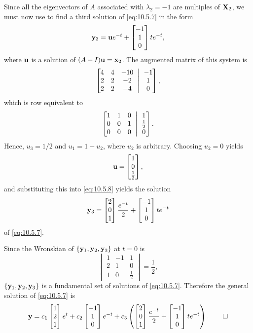 \begin{solution}
Since all the eigenvectors of $A$ associated with $\lambda_2=-1$ are
multiples of $\mathbf{X}_2$, we must now use  to
find a third solution of \eqref{eq:10.5.7} in the form
\begin{equation}\label{eq:10.5.8}
\mathbf{y}_3=\mathbf{u}e^{-t}+\begin{bmatrix}-1\\1\\0\end{bmatrix}te^{-t},
\end{equation}
where $\mathbf{u}$ is a solution of $(A+I)\mathbf{u}=\mathbf{x}_2$.
The  augmented matrix  of this system is
\[
\amatrix{4&4&-10\\2&2&-2\\2&2&-4}{-1\\1\\0},
\]
which is row equivalent to
\[
\amatrix{1&1&0\\0&0&1\\0&0&0}{1\\\frac12\\0}.
\]
Hence, $u_3=1/2$ and $u_1 =1-u_2$, where $u_2$  is
arbitrary. Choosing $u_2=0$ yields
\[
\mathbf{u} =\begin{bmatrix}1\\0\\\frac{1}{2}\end{bmatrix},
\]
and substituting this into  \eqref{eq:10.5.8}
yields the solution
\[
\mathbf{y}_3=\begin{bmatrix}2\\0\\1\end{bmatrix}\frac{e^{-t}}{2}+\begin{bmatrix}-1\\1\\0\end{bmatrix}te^{-t}
\]
of  \eqref{eq:10.5.7}.

Since the Wronskian of $\{\mathbf{y}_1,\mathbf{y}_2,\mathbf{y}_3\}$
at $t=0$ is
\[
\begin{vmatrix}1&-1&1\\2&1&0\\1&0&\frac12\end{vmatrix}=\frac{1}{2},
\]
$\{\mathbf{y}_1,\mathbf{y}_2,\mathbf{y}_3\}$ is a fundamental set of solutions
of \eqref{eq:10.5.7}. Therefore the general solution of \eqref{eq:10.5.7}
is
\[
\mathbf{y}=c_1\begin{bmatrix}1\\2\\1\end{bmatrix}e^t+c_2\begin{bmatrix}-1\\1\\0\end{bmatrix}e^{-t}+c_3\left
(\begin{bmatrix}2\\0\\1\end{bmatrix}\frac{e^{-t}}{2}+\begin{bmatrix}-1\\1\\0\end{bmatrix}te^{-t}\right).\qedhere
\]
\end{solution}

